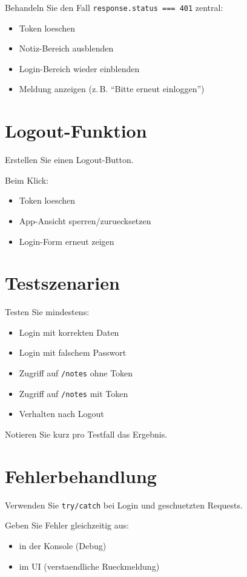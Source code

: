 \documentclass[a4paper,12pt]{article}
\begin{document}
Behandeln Sie den Fall \texttt{response.status === 401} zentral:
\begin{itemize}
    \item Token loeschen
    \item Notiz-Bereich ausblenden
    \item Login-Bereich wieder einblenden
    \item Meldung anzeigen (z.\,B. ``Bitte erneut einloggen'')
\end{itemize}

\section{Logout-Funktion}

Erstellen Sie einen Logout-Button.

Beim Klick:
\begin{itemize}
    \item Token loeschen
    \item App-Ansicht sperren/zuruecksetzen
    \item Login-Form erneut zeigen
\end{itemize}

\section{Testszenarien}

Testen Sie mindestens:
\begin{itemize}
    \item Login mit korrekten Daten
    \item Login mit falschem Passwort
    \item Zugriff auf \texttt{/notes} ohne Token
    \item Zugriff auf \texttt{/notes} mit Token
    \item Verhalten nach Logout
\end{itemize}

Notieren Sie kurz pro Testfall das Ergebnis.

\section{Fehlerbehandlung}

Verwenden Sie \texttt{try/catch} bei Login und geschuetzten Requests.

Geben Sie Fehler gleichzeitig aus:
\begin{itemize}
    \item in der Konsole (Debug)
    \item im UI (verstaendliche Rueckmeldung)
\end{itemize}
\end{document}
